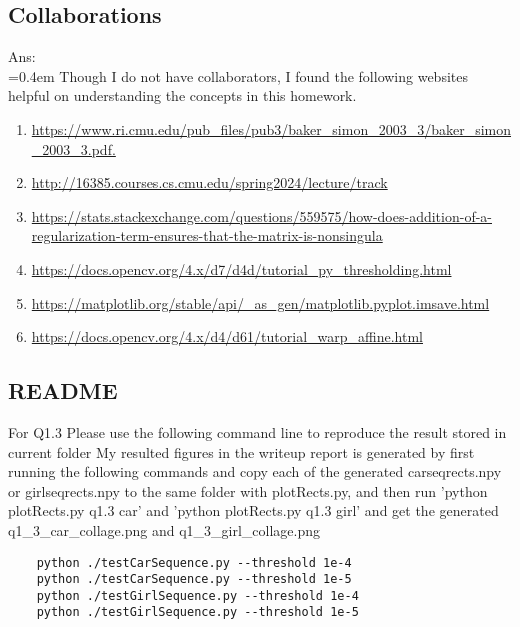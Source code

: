 \documentclass{article}
\begin{document}
	\newpage
	\subsection*{Collaborations}
	Ans:\\
	\hangindent=0.4em \hspace{0.3em} Though I do not have collaborators, I found the following websites helpful on understanding the concepts in this homework.
	\begin{enumerate}
		\item \url{https://www.ri.cmu.edu/pub_files/pub3/baker_simon_2003_3/baker_simon_2003_3.pdf.}
		\item \url{http://16385.courses.cs.cmu.edu/spring2024/lecture/track}
		\item \url{https://stats.stackexchange.com/questions/559575/how-does-addition-of-a-regularization-term-ensures-that-the-matrix-is-nonsingula}
		\item \url{https://docs.opencv.org/4.x/d7/d4d/tutorial_py_thresholding.html}
		\item \url{https://matplotlib.org/stable/api/_as_gen/matplotlib.pyplot.imsave.html}
		\item \url{https://docs.opencv.org/4.x/d4/d61/tutorial_warp_affine.html}		
	\end{enumerate}
	
	\newpage
	\subsection*{README}
	For Q1.3 Please use the following command line to reproduce the result stored in current folder
	My resulted figures in the writeup report is generated by first running the following commands and copy each of the generated carseqrects.npy or girlseqrects.npy to the same folder with plotRects.py, and then run 'python plotRects.py q1.3 car' and 'python plotRects.py q1.3 girl' and get the generated q1\_3\_car\_collage.png and q1\_3\_girl\_collage.png
	\begin{verbatim}
	python ./testCarSequence.py --threshold 1e-4
	python ./testCarSequence.py --threshold 1e-5
	python ./testGirlSequence.py --threshold 1e-4
	python ./testGirlSequence.py --threshold 1e-5
	\end{verbatim}
\end{document}
